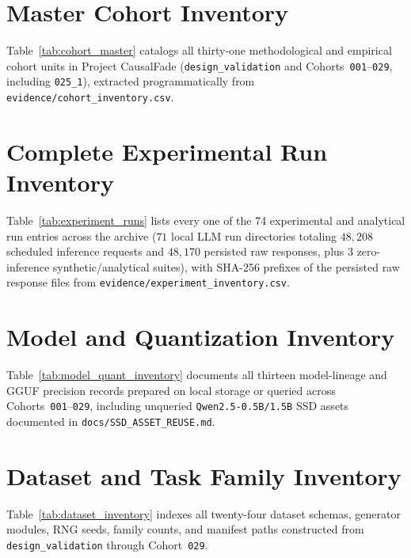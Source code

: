 
\chapter{Master Cohort Inventory}\label{app:cohort_inventory}
Table~\ref{tab:cohort_master} catalogs all thirty-one methodological and empirical cohort units in Project CausalFade (\texttt{design\_validation} and Cohorts~\texttt{001}--\texttt{029}, including \texttt{025\_1}), extracted programmatically from \texttt{evidence/cohort\_inventory.csv}.



\chapter{Complete Experimental Run Inventory}\label{app:run_inventory}
Table~\ref{tab:experiment_runs} lists every one of the 74 experimental and analytical run entries across the archive ($71$ local LLM run directories totaling $48{,}208$ scheduled inference requests and $48{,}170$ persisted raw responses, plus $3$ zero-inference synthetic/analytical suites), with SHA-256 prefixes of the persisted raw response files from \texttt{evidence/experiment\_inventory.csv}.



\chapter{Model and Quantization Inventory}\label{app:model_inventory}
Table~\ref{tab:model_quant_inventory} documents all thirteen model-lineage and GGUF precision records prepared on local storage or queried across Cohorts~\texttt{001}--\texttt{029}, including unqueried \texttt{Qwen2.5-0.5B/1.5B} SSD assets documented in \texttt{docs/SSD\_ASSET\_REUSE.md}.



\chapter{Dataset and Task Family Inventory}\label{app:dataset_inventory}
Table~\ref{tab:dataset_inventory} indexes all twenty-four dataset schemas, generator modules, RNG seeds, family counts, and manifest paths constructed from \texttt{design\_validation} through Cohort~\texttt{029}.

